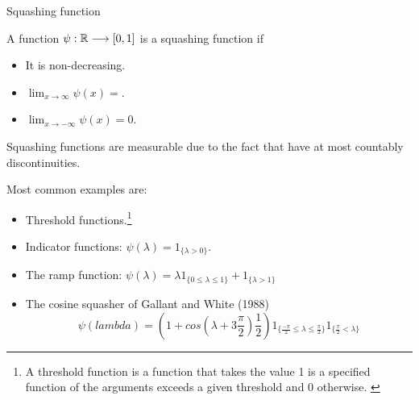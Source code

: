 \begin{definition} Squashing function

    A function $\psi: \mathbb{R} \longrightarrow [0,1]$ is a squashing function if
    \begin{itemize}
        \item It is non-decreasing.
        \item $\lim _{x \rightarrow \infty} \psi(x) = 
        $.
        \item $\lim _{x \rightarrow -\infty} \psi(x) = 0$.
    \end{itemize}  

    Squashing functions are measurable due to the fact that have at most 
    countably discontinuities.   

    Most common examples are: 
    \begin{itemize}
        \item Threshold functions.\footnote{
         A threshold function is a function that takes the value 1 
         is a specified function of the arguments exceeds a given threshold and 
         0 otherwise. \cite{threshold-definition} 
        }

        \item Indicator functions: $\psi(\lambda) = 1_{\{\lambda > 0\}}$. 
        \item The ramp function: $\psi(\lambda)  = \lambda 1_{\{0 \leq \lambda \leq  1\}} + 1_{\{\lambda > 1\}}$
    
        \item The cosine squasher of Gallant and White (1988)
        \begin{equation*}
    \psi(lambda )= (1 + cos(\lambda + 3 \frac{\pi}{2}) \frac{1}{2}) 
     1_{\{\frac{-\pi}{2} \leq \lambda \leq  \frac{\pi}{2}\}}
     1_{\{ \frac{\pi}{2} < \lambda \}}
    \end{equation*}
    \end{itemize}
\end{definition}  

